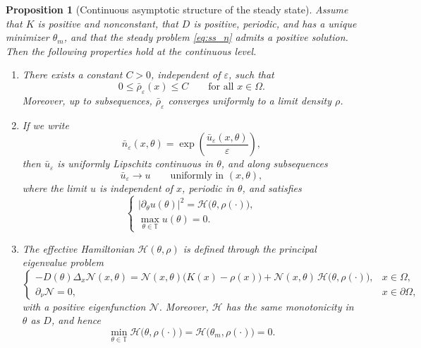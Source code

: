 \documentclass[11pt]{article}
\newtheorem{proposition}{Proposition}[section]
\begin{document}
\begin{proposition}[Continuous asymptotic structure of the steady state]\label{prop:continuous_structure}
Assume that \(K\) is positive and nonconstant, that \(D\) is positive, periodic, and has a unique minimizer \(\theta_m\), and that the steady problem \eqref{eq:ss_n} admits a positive solution. Then the following properties hold at the continuous level.
\begin{enumerate}
\item There exists a constant \(C>0\), independent of \(\varepsilon\), such that
\begin{equation}\label{eq:rho_continuous_bound}
0\le \bar\rho_\varepsilon(x)\le C
\qquad \text{for all } x\in\Omega.
\end{equation}
Moreover, up to subsequences, \(\bar\rho_\varepsilon\) converges uniformly to a limit density \(\rho\).

\item If we write
\begin{equation}\label{eq:u_log_transform}
\bar n_\varepsilon(x,\theta)=\exp\!\left(\frac{\bar u_\varepsilon(x,\theta)}{\varepsilon}\right),
\end{equation}
then \(\bar u_\varepsilon\) is uniformly Lipschitz continuous in \(\theta\), and along subsequences
\begin{equation}\label{eq:u_limit_uniform}
\bar u_\varepsilon \to u
\qquad \text{uniformly in } (x,\theta),
\end{equation}
where the limit \(u\) is independent of \(x\), periodic in \(\theta\), and satisfies
\begin{equation}\label{eq:HJ_limit}
\begin{cases}
|\partial_\theta u(\theta)|^2 = \mathcal H\bigl(\theta,\rho(\cdot)\bigr),\\[1mm]
\displaystyle \max_{\theta\in\mathbb T} u(\theta)=0.
\end{cases}
\end{equation}

\item The effective Hamiltonian \(\mathcal H(\theta,\rho)\) is defined through the principal eigenvalue problem
\begin{equation}\label{eq:eigen_N}
\begin{cases}
-D(\theta)\Delta_x \mathcal N(x,\theta)
= \mathcal N(x,\theta)\bigl(K(x)-\rho(x)\bigr)
+ \mathcal N(x,\theta)\,\mathcal H\bigl(\theta,\rho(\cdot)\bigr), & x\in\Omega,\\
\partial_\nu \mathcal N = 0, & x\in\partial\Omega,
\end{cases}
\end{equation}
with a positive eigenfunction \(\mathcal N\). Moreover, \(\mathcal H\) has the same monotonicity in \(\theta\) as \(D\), and hence
\begin{equation}\label{eq:H_min_zero}
\min_{\theta\in\mathbb T} \mathcal H\bigl(\theta,\rho(\cdot)\bigr)
=
\mathcal H\bigl(\theta_m,\rho(\cdot)\bigr)
=0.
\end{equation}


\end{enumerate}
\end{proposition}
\end{document}
